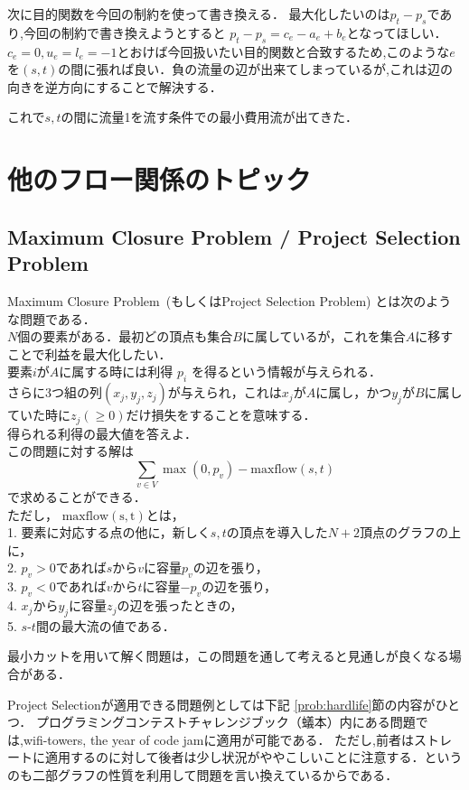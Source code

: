 \documentclass[13pt]{jarticle}
\theoremstyle{nonitalic} %
\begin{document}
次に目的関数を今回の制約を使って書き換える．
最大化したいのは$p_t-p_s$であり,今回の制約で書き換えようとすると
$p_t-p_s = c_e - a_e + b_e$となってほしい．$c_e=0, u_e=l_e=-1$とおけば今回扱いたい目的関数と合致するため,このような$e$を$(s,t)$の間に張れば良い．負の流量の辺が出来てしまっているが,これは辺の向きを逆方向にすることで解決する．

これで$s,t$の間に流量1を流す条件での最小費用流が出てきた．

\section{他のフロー関係のトピック}
\subsection{Maximum Closure Problem / Project Selection Problem}
Maximum Closure Problem~(もしくはProject Selection Problem) とは次のような問題である．\\

$N$個の要素がある．最初どの頂点も集合$B$に属しているが，これを集合$A$に移すことで利益を最大化したい． \\
要素$i$が$A$に属する時には利得 $p_i$ を得るという情報が与えられる． \\
さらに3つ組の列$(x_j, y_j, z_j)$が与えられ，これは$x_j$が$A$に属し，かつ$y_j$が$B$に属していた時に$z_j(\geq 0)$だけ損失をすることを意味する． \\
得られる利得の最大値を答えよ． \\


この問題に対する解は
\[ \sum_{v \in V } \max(0,p_v) - \mathrm{maxflow}(s,t) \]
で求めることができる．\\
ただし， $\mathrm{maxflow(s,t)}$とは，\\
1. 要素に対応する点の他に，新しく$s,t$の頂点を導入した$N+2$頂点のグラフの上に，\\
2. $p_v>0$であれば$s$から$v$に容量$p_v$の辺を張り，\\
3. $p_v<0$であれば$v$から$t$に容量$-p_v$の辺を張り，\\
4. $x_j$から$y_j$に容量$z_j$の辺を張ったときの，\\
5. $s$-$t$間の最大流の値である．


最小カットを用いて解く問題は，この問題を通して考えると見通しが良くなる場合がある．

Project Selectionが適用できる問題例としては下記 \ref{prob:hardlife}節の内容がひとつ．
プログラミングコンテストチャレンジブック（蟻本）内にある問題では,wifi-towers, the year of code jamに適用が可能である．
ただし,前者はストレートに適用するのに対して後者は少し状況がややこしいことに注意する．というのも二部グラフの性質を利用して問題を言い換えているからである．
\end{document}
